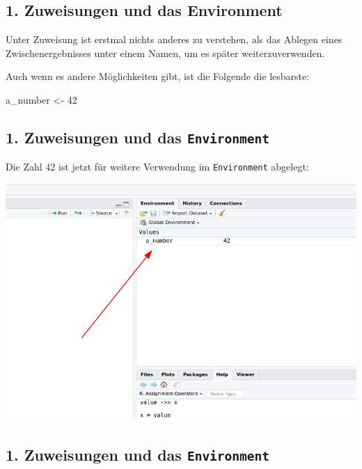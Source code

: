 \documentclass[
]{book}
\newenvironment{Shaded}{\begin{snugshade}}{\end{snugshade}}
\newcommand{\DecValTok}[1]{\textcolor[rgb]{0.00,0.00,0.81}{#1}}
\newcommand{\NormalTok}[1]{#1}
\newcommand{\OtherTok}[1]{\textcolor[rgb]{0.56,0.35,0.01}{#1}}
\begin{document}
\hypertarget{zuweisungen-und-das-environment}{%
\subsection{1. Zuweisungen und das Environment}\label{zuweisungen-und-das-environment}}

Unter Zuweisung ist erstmal nichts anderes zu verstehen, als das Ablegen eines Zwischenergebnisses unter einem Namen, um es später weiterzuverwenden.

Auch wenn es andere Möglichkeiten gibt, ist die Folgende die lesbarste:

\begin{Shaded}
\begin{Highlighting}[]
\NormalTok{a\_number }\OtherTok{\textless{}{-}} \DecValTok{42}
\end{Highlighting}
\end{Shaded}

\hypertarget{zuweisungen-und-das-environment-1}{%
\subsection{\texorpdfstring{1. Zuweisungen und das \texttt{Environment}}{1. Zuweisungen und das Environment}}\label{zuweisungen-und-das-environment-1}}

Die Zahl 42 ist jetzt für weitere Verwendung im \texttt{Environment} abgelegt:

\begin{center}\includegraphics[width=0.6\linewidth]{imgs/environment} \end{center}

\hypertarget{zuweisungen-und-das-environment-2}{%
\subsection{\texorpdfstring{1. Zuweisungen und das \texttt{Environment}}{1. Zuweisungen und das Environment}}\label{zuweisungen-und-das-environment-2}}
\end{document}
